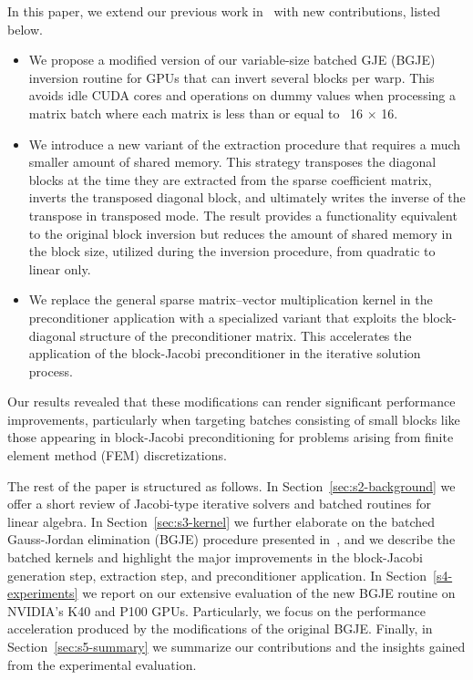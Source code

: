 In this paper, we extend our previous work in~\cite{Anzt:2017:BGE:3026937.3026940} with new contributions, listed below.
\begin{itemize}
\item We propose a modified version of our variable-size batched GJE (BGJE) inversion routine for GPUs that 
      {can invert} 
      several blocks per warp. This avoids idle CUDA cores and
        operations on dummy values when processing a matrix batch where each
        matrix is less than or equal to ~16 $\times$ 16.
\item We introduce a new variant of the extraction procedure that 
requires a much smaller amount of shared memory.
      This strategy transposes the diagonal blocks at the time they are extracted from
        the sparse {coefficient} matrix,
      inverts the transposed diagonal block, and ultimately writes the inverse of the transpose in transposed {mode}.
      The result provides a functionality equivalent to the original block inversion 
      but reduces the amount
      of shared memory in the block size, utilized during the inversion procedure, from quadratic to linear only.
\item We replace the general sparse matrix--vector multiplication kernel in the preconditioner application with a 
      specialized variant that exploits the block-diagonal structure of the preconditioner matrix. 
      This accelerates the application of the block-Jacobi preconditioner in the iterative solution process.
\end{itemize}
{Our} results revealed that these modifications can render
significant performance improvements, particularly when targeting batches
consisting of small blocks like those appearing in block-Jacobi preconditioning
for problems arising from finite element method (FEM) discretizations.

The rest of the paper is structured as follows. In
Section~\ref{sec:s2-background} we offer a short review of Jacobi-type iterative
solvers and batched routines for linear algebra. In Section~\ref{sec:s3-kernel}
we further elaborate on the batched Gauss-Jordan elimination (BGJE) procedure presented
in~\cite{Anzt:2017:BGE:3026937.3026940}, and we describe the batched kernels and
highlight the major improvements in the block-Jacobi generation step, extraction
step, and preconditioner application. In Section~\ref{s4-experiments} we report on
our extensive evaluation of the new BGJE routine on NVIDIA's K40 and P100 GPUs.
Particularly, we focus on the performance acceleration {produced by} the
modifications of the original BGJE. Finally, in Section~\ref{sec:s5-summary} we
summarize our contributions and the insights gained from the experimental
evaluation.

